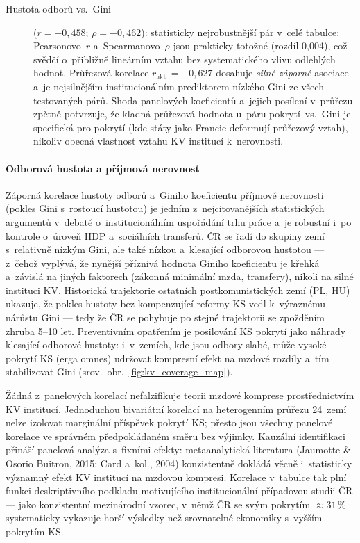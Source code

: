 \begin{description}
  \item[Hustota odborů vs.\ Gini]
    ($r = -0{,}458$; $\rho = -0{,}462$):
    statisticky nejrobustnější pár v~celé tabulce: Pearsonovo~$r$ a~Spearmanovo~$\rho$ jsou prakticky totožné (rozdíl 0,004), což svědčí o~přibližně lineárním vztahu bez systematického vlivu odlehlých hodnot.
    Průřezová korelace $r_{\text{akt.}} = -0{,}627$ dosahuje \emph{silné záporné} asociace a~je nejsilnějším institucionálním prediktorem nízkého Gini ze všech testovaných párů.
    Shoda panelových koeficientů a~jejich posílení v~průřezu zpětně potvrzuje, že kladná průřezová hodnota u~páru pokrytí~vs.~Gini je specifická pro pokrytí (kde státy jako Francie deformují průřezový vztah), nikoliv obecná vlastnost vztahu \ac{KV} institucí k~nerovnosti.
\end{description}

\paragraph{Odborová hustota a příjmová nerovnost}\label{par:union_gini}

Záporná korelace hustoty odborů a~Giniho koeficientu příjmové nerovnosti (pokles Gini s~rostoucí hustotou) je jedním z~nejcitovanějších statistických argumentů v~debatě o~institucionálním uspořádání trhu práce a~je robustní i~po kontrole o~úroveň \ac{HDP} a~sociálních transferů.
ČR se řadí do skupiny zemí s~relativně nízkým Gini, ale také nízkou a~klesající odborovou hustotou --- z~čehož vyplývá, že nynější příznivá hodnota Giniho koeficientu je křehká a~závislá na jiných faktorech (zákonná minimální mzda, transfery), nikoli na silné instituci \ac{KV}.
Historická trajektorie ostatních postkomunistických zemí (PL, HU) ukazuje, že pokles hustoty bez kompenzující reformy \ac{KS} vedl k~výraznému nárůstu Gini --- tedy že ČR se pohybuje po stejné trajektorii se zpožděním zhruba 5--10 let.
Preventivním opatřením je posilování \ac{KS} pokrytí jako náhrady klesající odborové hustoty: i~v~zemích, kde jsou odbory slabé, může vysoké pokrytí \ac{KS} (erga omnes) udržovat kompresní efekt na mzdové rozdíly a~tím stabilizovat Gini (srov.~obr.~\ref{fig:kv_coverage_map}).

Žádná z~panelových korelací nefalzifikuje teorii mzdové komprese prostřednictvím \ac{KV} institucí.
Jednoduchou bivariátní korelací na heterogenním průřezu 24~zemí nelze izolovat marginální příspěvek pokrytí \ac{KS}; přesto jsou všechny panelové korelace ve správném předpokládaném směru bez výjimky.
Kauzální identifikaci přináší panelová analýza s~fixními efekty: metaanalytická literatura (Jaumotte \& Osorio Buitron, 2015; Card a~kol., 2004) konzistentně dokládá věcně i~statisticky významný efekt \ac{KV} institucí na mzdovou kompresi.
Korelace v~tabulce tak plní funkci deskriptivního podkladu motivujícího institucionální případovou studii ČR --- jako konzistentní mezinárodní vzorec, v~němž ČR se svým pokrytím $\approx 31\,\%$ systematicky vykazuje horší výsledky než srovnatelné ekonomiky s~vyšším pokrytím \ac{KS}.


